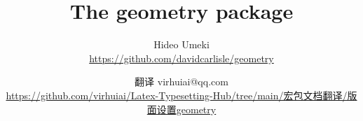 
\title{The \textsf{geometry} package}
\date{\filedate\ \fileversion}
\author{Hideo Umeki\\\url{https://github.com/davidcarlisle/geometry} \and 翻译 virhuiai@qq.com\\\url{https://github.com/virhuiai/Latex-Typesetting-Hub/tree/main/宏包文档翻译/版面设置geometry}}

\maketitle